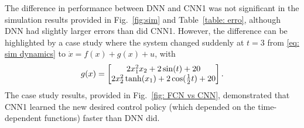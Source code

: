 \documentclass[letterpaper, 10 pt, conference]{ieeeconf}  %
\begin{document}
The difference in performance between DNN and CNN1 was not significant in the simulation results provided in Fig.~\ref{fig:sim} and Table~\ref{table: erro}, although DNN had slightly larger errors than did CNN1. However, the difference can be highlighted by a case study where the system changed suddenly at $t=3$ from \eqref{eq: sim dynamics} to $\dot x = f(x)+g(x)+u$, with 
\begin{equation}
    g(x) = 
	\begin{bmatrix}
		2x_1^2x_2 + 2\sin(t)+20\\
		2x_2^2\tanh(x_1)+2\cos({1\over2}t)+20
	\end{bmatrix}.
\end{equation}
The case study results, provided in Fig.~\ref{fig: FCN vs CNN}, demonstrated that CNN1 learned the new desired control policy (which depended on the time-dependent functions) faster than DNN did.


\end{document}
